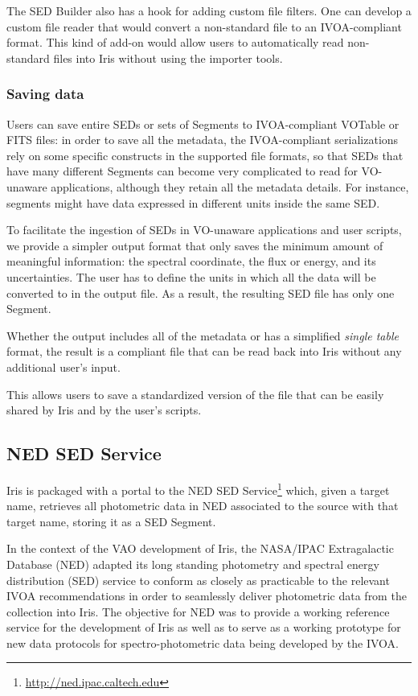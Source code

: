 \documentclass[final,5p]{elsarticle}
\begin{document}
The SED Builder also has a hook for adding custom file filters. One can develop a custom file reader that would convert a non-standard file to an IVOA-compliant format. This kind of add-on would allow users to automatically read non-standard files into Iris without using the importer tools.

\subsubsection{Saving data}
Users can save entire SEDs or sets of Segments to IVOA-compliant VOTable or FITS files: in order to save all the metadata, the IVOA-compliant serializations rely on some specific constructs in the supported file formats, so that SEDs that have many different Segments can become very complicated to read for VO-unaware applications, although they retain all the metadata details. For instance, segments might have data expressed in different units inside the same SED.

To facilitate the ingestion of SEDs in VO-unaware applications and user scripts, we provide a simpler output format that only saves the minimum amount of meaningful information: the spectral coordinate, the flux or energy, and its uncertainties. The user has to define the units in which all the data will be converted to in the output file. As a result, the resulting SED file has only one Segment.

Whether the output includes all of the metadata or has a simplified \emph{single table} format, the result is a compliant file that can be read back into Iris without any additional user's input.

This allows users to save a standardized version of the file that can be easily shared by Iris and by the user's scripts.

\subsection{NED SED Service}
\label{subsec:ned}

Iris is packaged with a portal to the NED SED Service\footnote{\url{http://ned.ipac.caltech.edu}} which, given a target name, retrieves all photometric data in NED associated to the source with that target name, storing it as a SED Segment.

In the context of the VAO development of Iris, the NASA/IPAC Extragalactic Database (NED) adapted its long standing photometry and spectral energy distribution (SED) service to conform as closely as practicable to the relevant IVOA recommendations in order to seamlessly deliver photometric data from the collection into Iris. The objective for NED was to provide a working reference service for the development of Iris as well as to serve as a working prototype for new data protocols for spectro-photometric data being developed by the IVOA.
\end{document}
